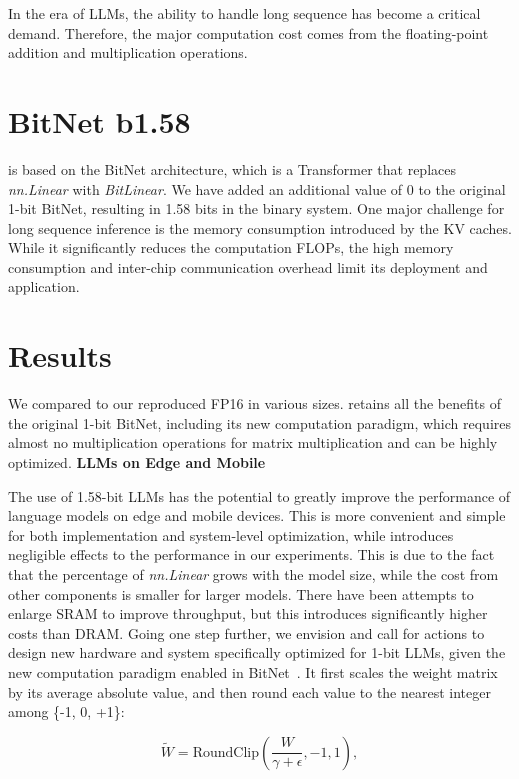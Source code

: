 In the era of LLMs, the ability to handle long sequence has become a critical demand. Therefore, the major computation cost comes from the floating-point addition and multiplication operations. \section{BitNet b1.58}

 is based on the BitNet architecture, which is a Transformer that replaces \emph{nn.Linear} with \emph{BitLinear}. We have added an additional value of 0 to the original 1-bit BitNet, resulting in 1.58 bits in the binary system. One major challenge for long sequence inference is the memory consumption introduced by the KV caches. While it significantly reduces the computation FLOPs, the high memory consumption and inter-chip communication overhead limit its deployment and application. \section{Results}

We compared  to our reproduced FP16  in various sizes.  retains all the benefits of the original 1-bit BitNet, including its new computation paradigm, which requires almost no multiplication operations for matrix multiplication and can be highly optimized. \textbf{LLMs on Edge and Mobile}

The use of 1.58-bit LLMs has the potential to greatly improve the performance of language models on edge and mobile devices. This is more convenient and simple for both implementation and system-level optimization, while introduces negligible effects to the performance in our experiments. This is due to the fact that the percentage of \emph{nn.Linear} grows with the model size, while the cost from other components is smaller for larger models. There have been attempts to enlarge SRAM to improve throughput, but this introduces significantly higher costs than DRAM. Going one step further, we envision and call for actions to design new hardware and system specifically optimized for 1-bit LLMs, given the new computation paradigm enabled in BitNet~\cite{bitnet}. It first scales the weight matrix by its average absolute value, and then round each value to the nearest integer among \{-1, 0, +1\}:

\begin{equation}
    \widetilde{W} = \mathrm{RoundClip}(\frac{W}{\gamma + \epsilon}, -1, 1),
\end{equation}

